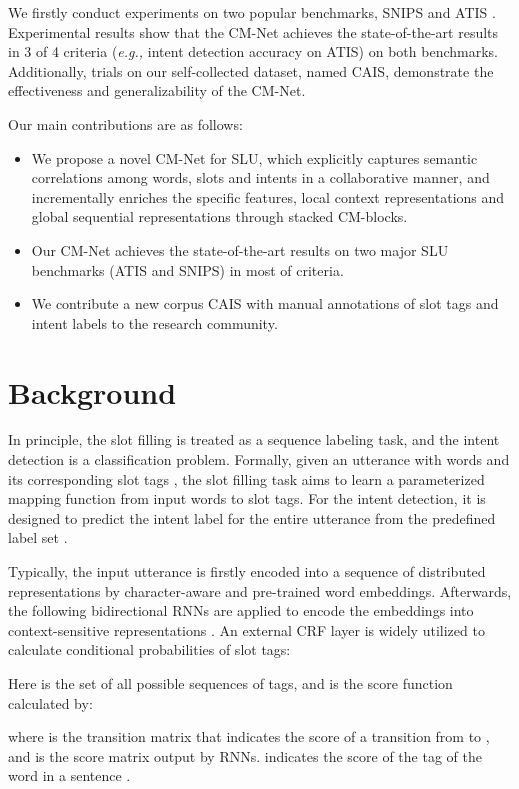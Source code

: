 \documentclass[11pt,a4paper]{article}
\begin{document}
We firstly conduct experiments on two popular benchmarks, SNIPS \cite{snips_2018} and ATIS \cite{atis_1990,atis_2010}. Experimental results show that the CM-Net achieves the state-of-the-art results in 3 of 4 criteria ({\em e.g.,} intent detection accuracy on ATIS) on both benchmarks. Additionally, trials on our self-collected dataset, named CAIS, demonstrate the effectiveness and generalizability of the CM-Net. 

Our main contributions are as follows:
\begin{itemize}
\item We propose a novel CM-Net for SLU, which explicitly captures semantic correlations among words, slots and intents in a collaborative manner, and incrementally enriches the specific features, local context representations and global sequential representations through stacked CM-blocks.
\item Our CM-Net achieves the state-of-the-art results on two major SLU benchmarks (ATIS and SNIPS) in most of criteria.
\item We contribute a new corpus CAIS with manual annotations of slot tags and intent labels to the research community.
\end{itemize}

\section{Background}
\label{background}
In principle, the slot filling is treated as a sequence labeling task, and the intent detection is a classification problem. Formally, given an utterance  with  words and its corresponding slot tags ,
the slot filling task aims to learn a parameterized mapping function  from input words to slot tags. For the intent detection, it is designed to predict the intent label  for the entire utterance  from the predefined label set .

Typically, the input utterance is firstly encoded into a sequence of distributed representations  by character-aware and pre-trained word embeddings. Afterwards, the following bidirectional RNNs are applied to encode the embeddings  into context-sensitive representations . An external CRF \cite{CRF} layer is widely utilized to calculate conditional probabilities of slot tags:

Here  is the set of all possible sequences of tags, and  is the score function calculated by:

where  is the transition matrix that  indicates the score of a transition from  to , and  is the score matrix  output by RNNs.  indicates the score of the  tag of the  word in a sentence \cite{lample_2016}.
\end{document}
